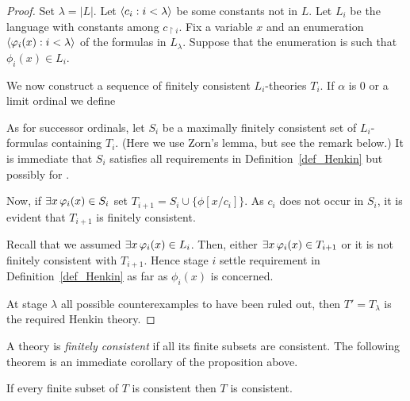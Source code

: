 \documentclass[creche.tex]{subfiles}
\begin{document}
\begin{proof} Set $\lambda=|L|$.
Let $\langle c_i:i<\lambda\rangle$ be some constants not in $L$.
Let $L_i$ be the language with constants among $c_{\restriction i}$.
Fix a variable $x$ and an enumeration $\langle\varphi_i(x):i<\lambda\rangle$ of the formulas in $L_\lambda$.
Suppose that the enumeration is such that $\phi_i(x)\in L_i$.

We now construct a sequence of finitely consistent $L_i$-theories $T_i$. 
If $\alpha$ is $0$ or a limit ordinal we define 


As for successor ordinals, let $S_i$ be a maximally finitely consistent set of $L_i$-formulas containing $T_i$. (Here we use Zorn's lemma, but see the remark below.) It is immediate that $S_i$ satisfies all requirements in Definition~\ref{def_Henkin} but possibly for .

Now, if $\exists x\,\varphi_i(x)\in S_i$ set $T_{i+1}=S_i\cup\big\{\phi[x/c_i]\big\}$. As $c_i$ does not occur in $S_i$, it is evident that $T_{i+1}$ is finitely consistent. 

Recall that we assumed $\exists x\,\varphi_i(x)\in L_i$. Then, either $\exists x\,\varphi_i(x)\in T_{i+1}$ or it is not finitely consistent with $T_{i+1}$. Hence stage $i$ settle requirement  in Definition~\ref{def_Henkin} as far as  $\phi_i(x)$ is concerned.

At stage $\lambda$ all possible counterexamples to  have been ruled out, then $T'=T_\lambda$ is the required Henkin theory.
\end{proof}

A theory is \emph{finitely consistent\/} if all its finite subsets are consistent. The following theorem is an immediate corollary of the proposition above.

\begin{void_thm}
If every finite subset of $T$ is consistent then $T$ is consistent.\QED
\end{void_thm}
\end{document}
